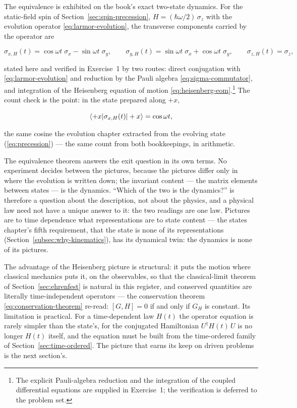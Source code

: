 The equivalence is exhibited on the book's exact two-state dynamics. For the static-field spin of Section~\ref{sec:spin-precession}, $H = (\hbar\omega/2)\,\sigma_z$ with the evolution operator \eqref{eq:larmor-evolution}, the transverse components carried by the operator are
\begin{linenomath}
    \begin{equation*}
        \sigma_{x,H}(t) = \cos\omega t\;\sigma_x - \sin\omega t\;\sigma_y, \qquad \sigma_{y,H}(t) = \sin\omega t\;\sigma_x + \cos\omega t\;\sigma_y, \qquad \sigma_{z,H}(t) = \sigma_z,
    \end{equation*}
\end{linenomath}
stated here and verified in Exercise~1 by two routes: direct conjugation with \eqref{eq:larmor-evolution} and reduction by the Pauli algebra \eqref{eq:sigma-commutator}, and integration of the Heisenberg equation of motion \eqref{eq:heisenberg-eom}.\footnote{The explicit Pauli-algebra reduction and the integration of the coupled differential equations are supplied in Exercise~1; the verification is deferred to the problem set.} The count check is the point: in the state prepared along $+x$,
\begin{linenomath}
    \begin{equation*}
        \braket{+x|\sigma_{x,H}(t)|+x} = \cos\omega t,
    \end{equation*}
\end{linenomath}
the same cosine the evolution chapter extracted from the evolving state (\eqref{eq:precession}) --- the same count from both bookkeepings, in arithmetic.

The equivalence theorem answers the exit question in its own terms. No experiment decides between the pictures, because the pictures differ only in where the evolution is written down; the invariant content --- the matrix elements between states --- is the dynamics. ``Which of the two is the dynamics?'' is therefore a question about the description, not about the physics, and a physical law need not have a unique answer to it: the two readings are one law. Pictures are to time dependence what representations are to state content --- the states chapter's fifth requirement, that the state is none of its representations (Section~\ref{subsec:why-kinematics}), has its dynamical twin: the dynamics is none of its pictures.

The advantage of the Heisenberg picture is structural: it puts the motion where classical mechanics puts it, on the observables, so that the classical-limit theorem of Section~\ref{sec:ehrenfest} is natural in this register, and conserved quantities are literally time-independent operators --- the conservation theorem \eqref{eq:conservation-theorem} re-read: $[G, H] = 0$ if and only if $G_H$ is constant. Its limitation is practical. For a time-dependent law $H(t)$ the operator equation is rarely simpler than the state's, for the conjugated Hamiltonian $U^\dagger H(t)\,U$ is no longer $H(t)$ itself, and the equation must be built from the time-ordered family of Section~\ref{sec:time-ordered}. The picture that earns its keep on driven problems is the next section's.

